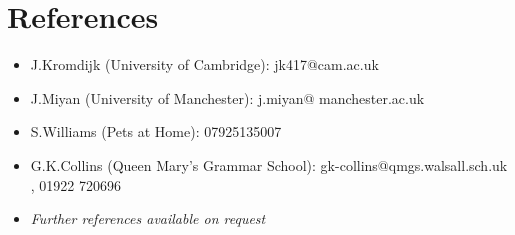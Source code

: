 \documentclass[letterpaper,10.8pt]{article}
\newcommand{\resumeItemListStart}{\begin{justify}\begin{itemize}[leftmargin=3ex, rightmargin=2ex, noitemsep,labelsep=1.2mm,itemsep=0mm]\small}
\newcommand{\resumeItemListEnd}{\end{itemize}\end{justify}\vspace{-2mm}}
\begin{document}
\section{\textbf{References}}
 \resumeItemListStart
     \item{J.Kromdijk (University of Cambridge): jk417@cam.ac.uk} \\
      \vspace{-10pt}
     \item{J.Miyan (University of Manchester): j.miyan@ manchester.ac.uk} \\
      \vspace{-9pt}
      \item{S.Williams (Pets at Home): 07925135007} \\
      \vspace{-10pt}
   \item{G.K.Collins (Queen Mary’s Grammar School): gk-collins@qmgs.walsall.sch.uk , 01922 720696} \\
   \vspace{-5pt}
    \item{\textit{Further references available on request}} 
   \vspace{-10pt}
 \resumeItemListEnd 
 \vspace{-3mm}

\end{document}
